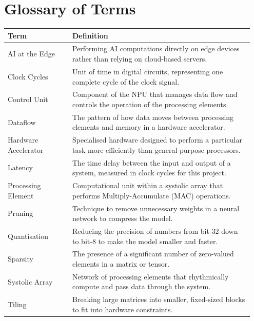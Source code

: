 \documentclass[12pt, a4paper, ukenglish]{article}
\begin{document}
\newpage

\section*{Glossary of Terms}

\begin{longtable}{p{0.25\linewidth} p{0.70\linewidth}}
    \toprule
    \textbf{Term} & \textbf{Definition} \\
    \midrule
    \endhead
    

    AI at the Edge & Performing AI computations directly on edge devices rather than relying on cloud-based servers. \\

    Clock Cycles & Unit of time in digital circuits, representing one complete cycle of the clock signal. \\

    Control Unit & Component of the NPU that manages data flow and controls the operation of the processing elements. \\
    
    Dataflow & The pattern of how data moves between processing elements and memory in a hardware accelerator. \\

    Hardware Accelerator & Specialised hardware designed to perform a particular task more efficiently than general-purpose processors. \\
    
    Latency & The time delay between the input and output of a system, measured in clock cycles for this project. \\


    Processing Element & Computational unit within a systolic array that performs Multiply-Accumulate (MAC) operations. \\
  
    Pruning & Technique to remove unnecessary weights in a neural network to compress the model. \\ 
  
    Quantisation & Reducing the precision of numbers from bit-32 down to bit-8 to make the model smaller and faster. \\
  
    Sparsity & The presence of a significant number of zero-valued elements in a matrix or tensor. \\

    Systolic Array & Network of processing elements that rhythmically compute and pass data through the system. \\
    
    Tiling & Breaking large matrices into smaller, fixed-sized blocks to fit into hardware constraints. \\ 
    \bottomrule
\end{longtable}
\addtocounter{table}{-1}
\clearpage
\newpage    
\end{document}
